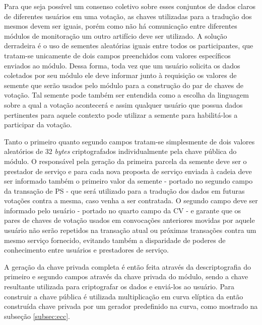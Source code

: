 %
Para que seja possível um consenso coletivo sobre esses conjuntos de dados claros de diferentes usuários em uma votação, as chaves utilizadas para a tradução dos mesmos devem ser iguais, porém como não há comunicação entre diferentes módulos de monitoração um outro artifício deve ser utilizado. A solução derradeira é o uso de sementes aleatórias iguais entre todos os participantes, que tratam-se unicamente de dois campos preenchidos com valores específicos enviados ao módulo. Dessa forma, toda vez que um usuário solicita os dados coletados por seu módulo ele deve informar junto à requisição os valores de semente que serão usados pelo módulo para a construção do par de chaves de votação. Tal semente pode também ser entendida como a escolha da linguagem sobre a qual a votação acontecerá e assim qualquer usuário que possua dados pertinentes para aquele contexto pode utilizar a semente para habilitá-los a participar da votação.

Tanto o primeiro quanto segundo campos tratam-se simplesmente de dois valores aleatórios de 32 \textit{bytes} criptografados individualmente pela chave pública do módulo. O responsável pela geração da primeira parcela da semente deve ser o prestador de serviço e para cada nova proposta de serviço enviada à cadeia deve ser informado também o primeiro valor da semente - portado no segundo campo da transação de \ac{PS} - que será utilizado para a tradução dos dados em futuras votações contra a mesma, caso venha a ser contratada. O segundo campo deve ser informado pelo usuário - portado no quarto campo da \ac{CV} - e garante que os pares de chaves de votação usados em convocações anteriores movidas por aquele usuário não serão repetidos na transação atual ou próximas transações contra um mesmo serviço fornecido, evitando também a disparidade de poderes de conhecimento entre usuários e prestadores de serviço.

%
A geração da chave privada completa é então feita através da descriptografia do primeiro e segundo campos através da chave privada do módulo, sendo a chave resultante utilizada para criptografar os dados e enviá-los ao usuário. Para construir a chave pública é utilizada multiplicação em curva elíptica da então construída chave privada por um gerador predefinido na curva, como mostrado na subseção \ref{subsec:ecc}.

%

